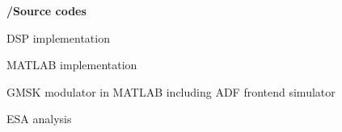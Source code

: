  
\textbf{/Source codes}\\
\vspace{-10mm}
    \begin{pitemize}
        \item DSP implementation
        \item MATLAB implementation
        \item GMSK modulator in MATLAB including ADF frontend simulator
        \item ESA analysis
    \end{pitemize}
 
